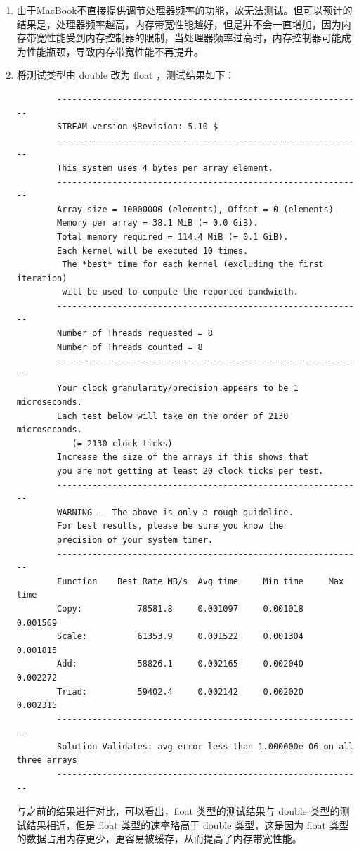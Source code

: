 \documentclass[UTF8]{report}
\begin{document}
\begin{enumerate}[label=(\arabic*)]
    \item 由于MacBook不直接提供调节处理器频率的功能，故无法测试。但可以预计的结果是，处理器频率越高，内存带宽性能越好，但是并不会一直增加，因为内存带宽性能受到内存控制器的限制，当处理器频率过高时，内存控制器可能成为性能瓶颈，导致内存带宽性能不再提升。
    
    \item 将测试类型由 double 改为 float ，测试结果如下：
    
    \begin{lstlisting}
        -------------------------------------------------------------
        STREAM version $Revision: 5.10 $
        -------------------------------------------------------------
        This system uses 4 bytes per array element.
        -------------------------------------------------------------
        Array size = 10000000 (elements), Offset = 0 (elements)
        Memory per array = 38.1 MiB (= 0.0 GiB).
        Total memory required = 114.4 MiB (= 0.1 GiB).
        Each kernel will be executed 10 times.
         The *best* time for each kernel (excluding the first iteration)
         will be used to compute the reported bandwidth.
        -------------------------------------------------------------
        Number of Threads requested = 8
        Number of Threads counted = 8
        -------------------------------------------------------------
        Your clock granularity/precision appears to be 1 microseconds.
        Each test below will take on the order of 2130 microseconds.
           (= 2130 clock ticks)
        Increase the size of the arrays if this shows that
        you are not getting at least 20 clock ticks per test.
        -------------------------------------------------------------
        WARNING -- The above is only a rough guideline.
        For best results, please be sure you know the
        precision of your system timer.
        -------------------------------------------------------------
        Function    Best Rate MB/s  Avg time     Min time     Max time
        Copy:           78581.8     0.001097     0.001018     0.001569
        Scale:          61353.9     0.001522     0.001304     0.001815
        Add:            58826.1     0.002165     0.002040     0.002272
        Triad:          59402.4     0.002142     0.002020     0.002315
        -------------------------------------------------------------
        Solution Validates: avg error less than 1.000000e-06 on all three arrays
        -------------------------------------------------------------
    \end{lstlisting}

    与之前的结果进行对比，可以看出，float 类型的测试结果与 double 类型的测试结果相近，但是 float 类型的速率略高于 double 类型，这是因为 float 类型的数据占用内存更少，更容易被缓存，从而提高了内存带宽性能。
\end{enumerate}
\end{document}
